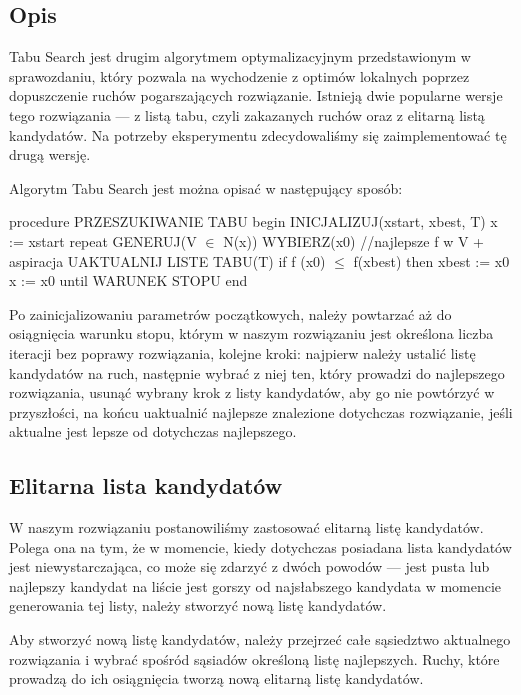\subsection{Opis}

Tabu Search jest drugim algorytmem optymalizacyjnym przedstawionym w sprawozdaniu, który pozwala na wychodzenie z optimów lokalnych poprzez dopuszczenie ruchów pogarszających rozwiązanie. Istnieją dwie popularne wersje tego rozwiązania --- z listą tabu, czyli zakazanych ruchów oraz z elitarną listą kandydatów. Na potrzeby eksperymentu zdecydowaliśmy się zaimplementować tę drugą wersję.

Algorytm Tabu Search jest można opisać w następujący sposób\cite{TS}:

\begin{algorithm}[caption={Integer division.}, label={alg1}]
procedure PRZESZUKIWANIE TABU
begin
  INICJALIZUJ(xstart, xbest, T)
  x := xstart
  repeat
    GENERUJ(V $\in$ N(x))
    WYBIERZ(x0) //najlepsze f w V + aspiracja
    UAKTUALNIJ LISTE TABU(T)
    if f (x0) $\le$ f(xbest) then xbest := x0
    x := x0
  until WARUNEK STOPU
end
\end{algorithm}

Po zainicjalizowaniu parametrów początkowych, należy powtarzać aż do osiągnięcia warunku stopu, którym w naszym rozwiązaniu jest określona liczba iteracji bez poprawy rozwiązania, kolejne kroki: najpierw należy ustalić listę kandydatów na ruch, następnie wybrać z niej ten, który prowadzi do najlepszego rozwiązania, usunąć wybrany krok z listy kandydatów, aby go nie powtórzyć w przyszłości, na końcu uaktualnić najlepsze znalezione dotychczas rozwiązanie, jeśli aktualne jest lepsze od dotychczas najlepszego.

\subsection{Elitarna lista kandydatów}

W naszym rozwiązaniu postanowiliśmy zastosować elitarną listę kandydatów. Polega ona na tym, że w momencie, kiedy dotychczas posiadana lista kandydatów jest niewystarczająca, co może się zdarzyć z dwóch powodów --- jest pusta lub najlepszy kandydat na liście jest gorszy od najsłabszego kandydata w momencie generowania tej listy, należy stworzyć nową listę kandydatów.

Aby stworzyć nową listę kandydatów, należy przejrzeć całe sąsiedztwo aktualnego rozwiązania i wybrać spośród sąsiadów określoną listę najlepszych. Ruchy, które prowadzą do ich osiągnięcia tworzą nową elitarną listę kandydatów.

